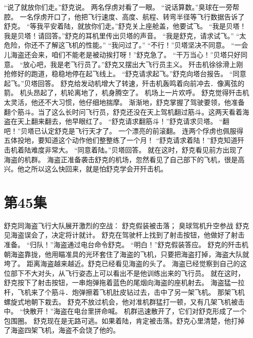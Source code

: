 \documentclass[a4paper,12pt,UTF8,twoside]{ctexbook}
\begin{document}
        “说了就放你们走。”舒克说。 
        两名俘虏对看了一眼。 
        “说话算数。”臭球在一旁帮腔。 
        一名俘虏开口了，他把飞行速度、高度、航程、转弯半径等飞行数据告诉了舒克。 
        “等我平安着陆，就放你们走。”舒克关上座舱盖，他要试飞。 
        “我是贝塔！我是贝塔！请回答。”舒克的耳机里传出贝塔的声音。 
        “我是舒克，请求试飞。” 
        “太危险，你还不了解这飞机的性能。” 
        “我问过了。” 
        “不行！”贝塔坚决不同意。 
        “一会儿海盗还会来，咱们不能老是被动挨打呀！”舒克急了。 
        “干万当心！”贝塔只好同意。 
        “放心吧，我是老飞行员了。”舒克又摆出大飞行员主义。 
        歼击机徐徐滑上刚抢修好的跑道，稳稳地停在起飞线上。 
        “舒克请求起飞。”舒克向塔台报告。 
        “同意起飞。”贝塔回答。 
        舒克给发动机增大了转速，歼击机轰鸣着向前冲去．像离弦的箭。 
        机头昂起了，机轮离地了，机身腾空了。 
        机场上一片欢呼。 
        舒克觉得歼击机太灵活，他还不大习惯，他仔细地揣摩。 
        渐渐地，舒克掌握了驾驶要领，他准备翻个筋斗。当了这么长时问飞行员，舒克还没在天上驾机翻过筋斗。这两天看着海盗在天上翻来翻去，他早眼红了。 
        “舒克请求翻筋斗！”舒克请求贝塔。 
        “翻吧！”贝塔已认定舒克是飞行天才了。 
        一个漂亮的前滚翻。 
        连两个俘虏也佩服得五体投地，要知道这个动作他们整整练了一个月！ 
        “舒克请求着陆！”舒克知道歼击机着陆难度非常大。 
        “同意着陆。”贝塔回答。 
        就在这时，舒克看见前方出现了海盗的机群。 
        海盗正准备袭击舒克的机场，忽然看见了自己部下的飞机，很是高兴。他之所以这么快回来，就是怕舒克学会开歼击机。   \chapter{第45集} 
        舒克同海盗飞行大队展开激烈的空战： 
        舒克假装被击落； 
        臭球驾机升空参战   
        舒克见海盗误会了，决定将计就计。 
        舒克在驾驶杆上找到了射击按钮，他做好了射击准备。 
        “归队！”海盗通过电台命令舒克。 
        “明白！”舒克假装答应。 
        舒克的歼击机朝海盗靠拢，他用瞄准具的光环套住了海盗的飞机，只要把海盗打掉，海盗大队就 垮了。 
        距离海盗越来越近。舒克已经看见海盗的头了。 
        海盗已经觉察到自己的这位部下不大对头，从飞行姿态上可以看出不是他训练出来的飞行员。 
        就在这时，舒克按下了射击按钮，一串炮弹拖着蓝色的尾烟向海盗的座机射去。 
        海盗猛一拉杆，飞机来了个筋斗．炮弹擦着飞机肚皮钻过去，击中了另一架飞机。 
        那架飞机螺旋式地朝下栽去。 
        舒克不放过机会，他对准机群猛打一顿，又有几架飞机被击中。 
        “快散开！”海盗在电台里拼命喊。 
        机群迅速散开了，它们对舒克形成了一个包围圈。 
        舒克现在是无路可逃。如果着陆，肯定被击落。舒克心里清楚，他打掉了海盗四架飞机，海盗不会饶了他的。 
\end{document}
